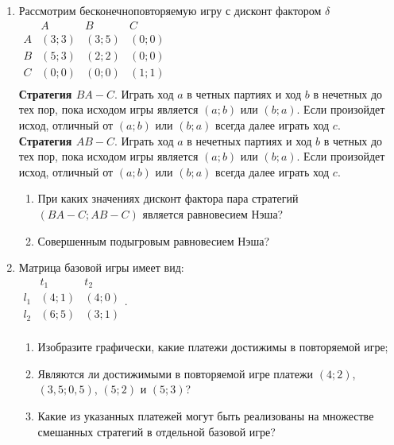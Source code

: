 \documentclass[pdftex,12pt,a4paper]{article}
\begin{document}
\begin{enumerate}
\item Рассмотрим бесконечноповторяемую игру с дисконт фактором $\delta$\\
$\begin{array}{c|ccc}
    {} &  A & B & C   \\
\hline
    A &  {\left( {3;3} \right)} & {\left( {3;5} \right)} & {\left( {0;0} \right)}   \\
    B &  {\left( {5;3} \right)} & {\left( {2;2} \right)} & {\left( {0;0} \right)}   \\
    C &  {\left( {0;0} \right)} & {\left( {0;0} \right)} & {\left( {1;1} \right)}   \\
\end{array}$\\
\textbf{Стратегия $BA - C$}. Играть ход $a$ в четных партиях и ход $b$ в нечетных до тех пор,
пока исходом игры является $\left( {a;b} \right)$ или $\left( {b;a} \right)$. Если произойдет исход, отличный от $\left( {a;b} \right)$ или $\left( {b;a} \right)$ всегда далее играть ход $c$.\\
\textbf{Стратегия $AB - C$}. Играть ход $a$ в нечетных партиях и ход $b$ в четных до тех пор,
пока исходом игры является $\left( {a;b} \right)$ или $\left( {b;a} \right)$. Если произойдет исход, отличный от $\left( {a;b} \right)$ или $\left( {b;a} \right)$ всегда далее играть ход $c$.
\begin{enumerate}
\item При каких значениях дисконт фактора пара стратегий $\left( {BA - C;AB - C} \right)$ является равновесием Нэша?
\item Совершенным подыгровым равновесием Нэша?
\end{enumerate}

\item Матрица базовой игры имеет вид:\\ $\begin{array}{c|cc}
    {} &  {t_1 } & {t_2 }   \\
\hline
    {l_1 } &  {\left( {4;1} \right)} & {\left( {4;0} \right)}   \\
    {l_2 } &  {\left( {6;5} \right)} & {\left( {3;1} \right)}   \\
\end{array}$.
\begin{enumerate}
\item Изобразите графически, какие платежи достижимы в повторяемой игре;
\item Являются ли достижимыми в повторяемой игре платежи $\left( {4;2} \right)$, $\left( {3,5;0,5} \right)$, $\left( {5;2} \right)$ и $\left( {5;3} \right)$?  
\item Какие из указанных платежей могут быть реализованы на множестве смешанных стратегий в отдельной базовой игре?
\end{enumerate}


\end{enumerate}
\end{document}
